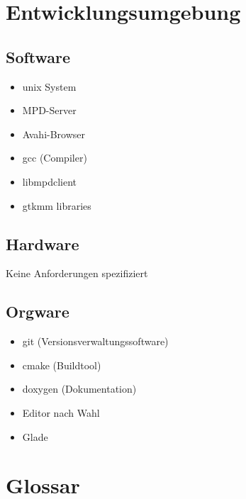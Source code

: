 \section{Entwicklungsumgebung}
\subsection{Software}
\begin{itemize}
	\item unix System
	\item MPD-Server	
	\item Avahi-Browser
	\item gcc (Compiler)
	\item libmpdclient
	\item gtkmm libraries
\end{itemize}
\subsection{Hardware}
Keine Anforderungen spezifiziert
\subsection{Orgware}
\begin{itemize}
	\item git (Versionsverwaltungssoftware)
	\item cmake (Buildtool)
	\item doxygen (Dokumentation)
	\item Editor nach Wahl
	\item Glade
\end{itemize}
\section{Glossar}
